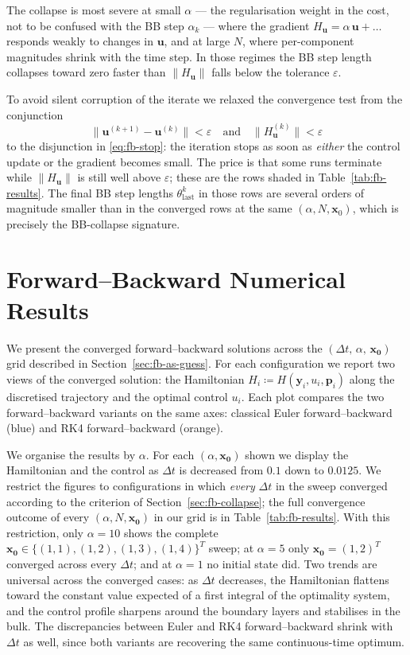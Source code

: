 \documentclass[a4paper, 10pt]{article}
\begin{document}
The collapse is most severe at small $\alpha$ --- the regularisation
weight in the cost, not to be confused with the BB step $\alpha_k$ ---
where the gradient
$H_{\bm{u}} = \alpha\,\bm{u} + \dots$ responds weakly to changes in
$\bm{u}$, and at large $N$, where per-component magnitudes shrink with
the time step. In those regimes the BB step length collapses toward zero
faster than $\|H_{\bm{u}}\|$ falls below the tolerance $\varepsilon$.

To avoid silent corruption of the iterate we relaxed the convergence
test from the conjunction
\begin{equation*}
    \bigl\|\bm{u}^{(k+1)} - \bm{u}^{(k)}\bigr\| < \varepsilon
    \quad \text{and} \quad
    \bigl\|H_{\bm{u}}^{(k)}\bigr\| < \varepsilon
\end{equation*}
to the disjunction in \eqref{eq:fb-stop}: the iteration stops as soon as
\emph{either} the control update or the gradient becomes small. The
price is that some runs terminate while $\|H_{\bm{u}}\|$ is still well
above $\varepsilon$; these are the rows shaded in
Table~\ref{tab:fb-results}. The final BB step lengths
$\theta^{k}_{\mathrm{last}}$ in those rows are several orders of
magnitude smaller than in the converged rows at the same
$(\alpha, N, \bm{x}_0)$, which is precisely the BB-collapse signature.

\section{Forward--Backward Numerical Results}
\label{sec:fb-numerical}

We present the converged forward--backward solutions across the
$(\Delta t,\,\alpha,\,\mathbf{x_0})$ grid described in
Section~\ref{sec:fb-as-guess}. For each configuration we report two views
of the converged solution: the Hamiltonian
$H_i \coloneqq H(\mathbf{y}_i,u_i,\mathbf{p}_i)$ along the discretised
trajectory and the optimal control $u_i$. Each plot compares the two
forward--backward variants on the same axes: classical Euler
forward--backward (blue) and RK4 forward--backward (orange).

We organise the results by $\alpha$. For each $(\alpha, \mathbf{x_0})$
shown we display the Hamiltonian and the control as $\Delta t$ is
decreased from $0.1$ down to $0.0125$. We restrict the figures to
configurations in which \emph{every} $\Delta t$ in the sweep converged
according to the criterion of Section~\ref{sec:fb-collapse}; the full
convergence outcome of every $(\alpha, N, \mathbf{x_0})$ in our grid is
in Table~\ref{tab:fb-results}. With this restriction, only $\alpha = 10$
shows the complete $\mathbf{x_0} \in \{(1,1),(1,2),(1,3),(1,4)\}^{T}$
sweep; at $\alpha = 5$ only $\mathbf{x_0} = (1,2)^{T}$ converged across
every $\Delta t$; and at $\alpha = 1$ no initial state did. Two trends
are universal across the converged cases: as $\Delta t$ decreases, the
Hamiltonian flattens toward the constant value expected of a first
integral of the optimality system, and the control profile sharpens
around the boundary layers and stabilises in the bulk. The discrepancies
between Euler and RK4 forward--backward shrink with $\Delta t$ as well,
since both variants are recovering the same continuous-time optimum.
\end{document}

